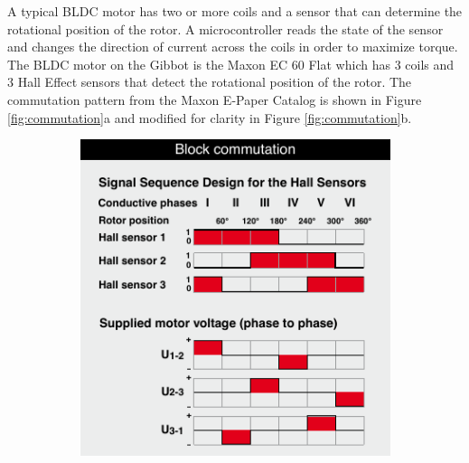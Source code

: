 \documentclass{article}
\begin{document}
A typical BLDC motor has two or more coils and a sensor that can determine the rotational position of the rotor. A microcontroller reads the state of the sensor and changes the direction of current across the coils in order to maximize torque. The BLDC motor on the Gibbot is the Maxon EC 60 Flat which has 3 coils and 3 Hall Effect sensors that detect the rotational position of the rotor. The commutation pattern from the Maxon E-Paper Catalog is shown in Figure \ref{fig:commutation}a and modified for clarity in Figure \ref{fig:commutation}b. 
\begin{figure}[h!]
	\centering
	\begin{subfigure}{0.4\textwidth}
		\includegraphics[width=\textwidth]{commutation}
		\caption{}
	\end{subfigure}
	\quad
	\begin{subfigure}{0.4\textwidth}

\end{subfigure}
\end{figure}
\end{document}
